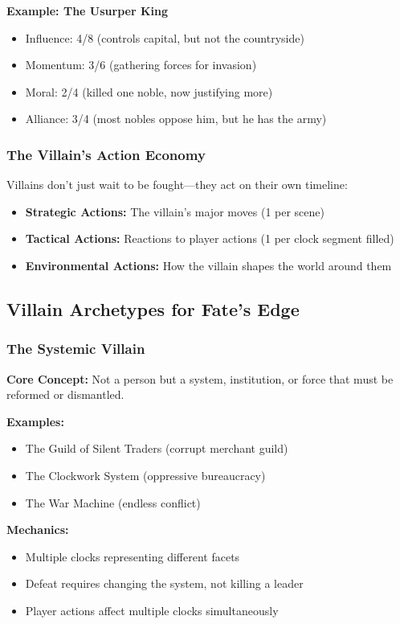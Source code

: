 \textbf{Example: The Usurper King}
\begin{itemize}
  \item Influence: 4/8 (controls capital, but not the countryside)
  \item Momentum: 3/6 (gathering forces for invasion)
  \item Moral: 2/4 (killed one noble, now justifying more)
  \item Alliance: 3/4 (most nobles oppose him, but he has the army)
\end{itemize}

\subsubsection{The Villain's Action Economy}

Villains don't just wait to be fought---they act on their own timeline:

\begin{itemize}
  \item \textbf{Strategic Actions:} The villain's major moves (1 per scene)
  \item \textbf{Tactical Actions:} Reactions to player actions (1 per clock segment filled)
  \item \textbf{Environmental Actions:} How the villain shapes the world around them
\end{itemize}

\subsection{Villain Archetypes for Fate's Edge}

\subsubsection{The Systemic Villain}

\textbf{Core Concept:} Not a person but a system, institution, or force that must be reformed or dismantled.

\textbf{Examples:}
\begin{itemize}
  \item The Guild of Silent Traders (corrupt merchant guild)
  \item The Clockwork System (oppressive bureaucracy)
  \item The War Machine (endless conflict)
\end{itemize}

\textbf{Mechanics:}
\begin{itemize}
  \item Multiple clocks representing different facets
  \item Defeat requires changing the system, not killing a leader
  \item Player actions affect multiple clocks simultaneously
\end{itemize}

